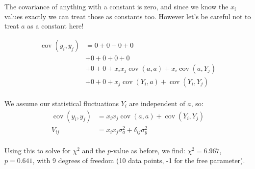 \begin{enumerate}[label=\textbf{\Alph*}.]
    The covariance of anything with a constant is zero, and since we know the $x_i$ values exactly we can treat those as constants too. However let's be careful not to treat $a$ as a constant here!

    \begin{align*}
        \operatorname{cov}(y_i, y_j) &= 0
         + 0
         + 0
         + 0 \\
        &+ 0
         + 0
         + 0
         + 0 \\
        &+ 0
         + 0
         + x_ix_j\operatorname{cov}(a, a)
         + x_i\operatorname{cov}(a, Y_j) \\
        &+ 0
         + 0
         + x_j\operatorname{cov}(Y_i, a)
         + \operatorname{cov}(Y_i, Y_j) \\
    \end{align*}

    We assume our statistical fluctuations $Y_i$ are independent of $a$, so:
    \begin{align*}
        \operatorname{cov}(y_i, y_j) &= x_ix_j\operatorname{cov}(a, a) + \operatorname{cov}(Y_i, Y_j) \\
        V_{ij} &= x_ix_j\sigma_a^2 + \delta_{ij}\sigma_y^2 \\
    \end{align*}

    Using this to solve for $\chi^2$ and the $p$-value as before, we find: $\chi^2=6.967$, $p=0.641$, with 9 degrees of freedom (10 data points, -1 for the free parameter).


\end{enumerate}
